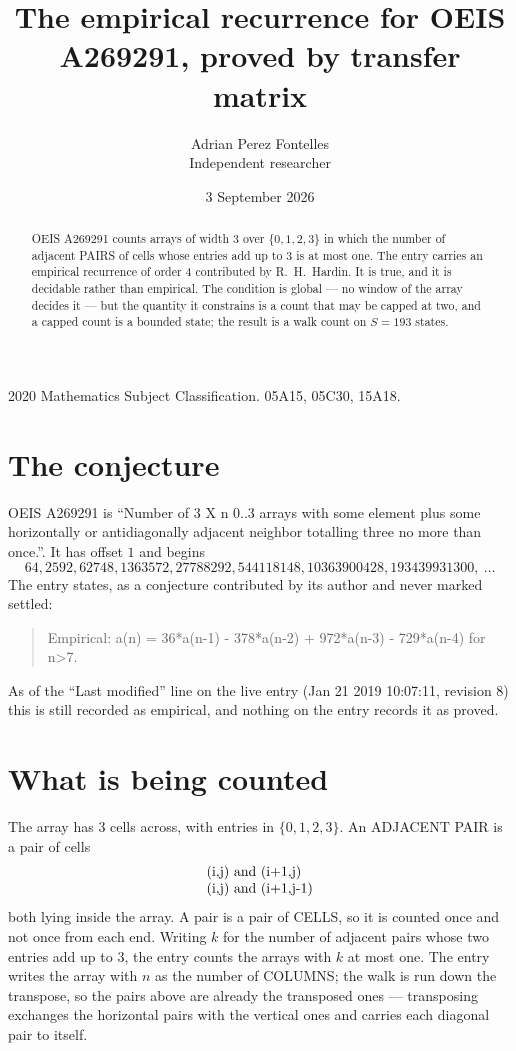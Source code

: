 \documentclass[11pt,a4paper]{article}
\title{The empirical recurrence for OEIS A269291, proved by transfer matrix}
\author{Adrian Perez Fontelles\\ \small Independent researcher}
\date{3 September 2026}
\theoremstyle{plain}
\theoremstyle{definition}
\begin{document}
\maketitle

\begin{abstract}
OEIS A269291 counts arrays of width $3$ over $\{0,1,2,3\}$ in which the number of adjacent PAIRS of
cells whose entries add up to $3$ is at most one. The entry carries an empirical recurrence of
order $4$ contributed by R.~H.~Hardin. It is true, and it is decidable rather than
empirical. The condition is global --- no window of the array decides it --- but the quantity
it constrains is a count that may be capped at two, and a capped count is a bounded state; the
result is a walk count on $S=193$ states.
\end{abstract}

\noindent\small 2020 Mathematics Subject Classification. 05A15, 05C30, 15A18.\normalsize

\section{The conjecture}

OEIS A269291 is ``Number of 3 X n 0..3 arrays with some element plus some horizontally or antidiagonally adjacent neighbor totalling three no more than once.''. It has offset $1$ and begins
\[
64, 2592, 62748, 1363572, 27788292, 544118148, 10363900428, 193439931300,\ \dots
\]
The entry states, as a conjecture contributed by its author and never marked settled:
\begin{quote}
Empirical: a(n) = 36*a(n-1) - 378*a(n-2) + 972*a(n-3) - 729*a(n-4) for n>7.
\end{quote}
As of the ``Last modified'' line on the live entry (Jan 21 2019 10:07:11, revision 8) this is still
recorded as empirical, and nothing on the entry records it as proved.

\section{What is being counted}

The array has $3$ cells across, with entries in $\{0,1,2,3\}$. An ADJACENT PAIR is a pair of cells
\[
\begin{array}{l}
$(i,j)\text{ and }(i{+}1,j)$ \\
$(i,j)\text{ and }(i{+}1,j{-}1)$ \\
\end{array}
\]
both lying inside the array. A pair is a pair of CELLS, so it is counted once and not once from
each end. Writing $k$ for the number of adjacent pairs whose two entries add up to $3$, the
entry counts the arrays with $k$ at most one. The entry writes the array with $n$ as the number of COLUMNS; the walk is run down the transpose, so the pairs above are already the transposed ones --- transposing exchanges the horizontal pairs with the vertical ones and carries each diagonal pair to itself.
\end{document}
